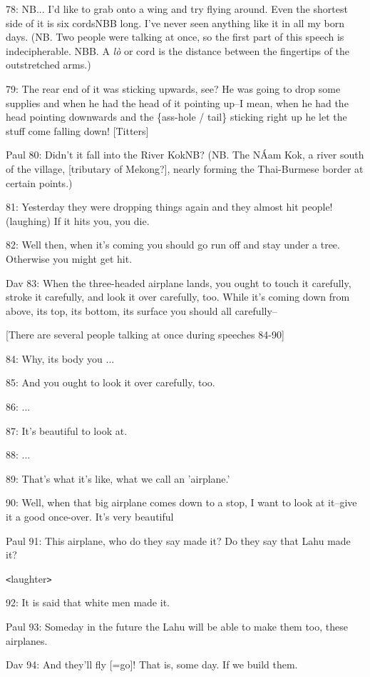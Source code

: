 78: NB... I'd like to grab onto a wing and try flying around. Even the shortest
side of it is six cordsNBB long. I've never seen anything like it in all my born
days. (NB. Two people were talking at once, so the first part of this speech is
indecipherable. NBB. A \textit{lò} or cord is the distance between the fingertips
of the outstretched arms.)

79: The rear end of it was sticking upwards, see? He was going to drop some supplies
and when he had the head of it pointing up--I mean, when he had the head pointing
downwards and the \{ass-hole / tail\} sticking right up he let the stuff come falling
down! [Titters]

Paul 80: Didn't it fall into the River KokNB? (NB. The NÁam Kok, a river south
of the village, [tributary of Mekong?], nearly forming the Thai-Burmese border
at certain points.)

81: Yesterday they were dropping things again and they almost hit people! (laughing)
If it hits you, you die.

82: Well then, when it's coming you should go run off and stay under a tree. Otherwise
you might get hit.

Dav 83: When the three-headed airplane lands, you ought to touch it carefully,
stroke it carefully, and look it over carefully, too. While it's coming down from
above, its top, its bottom, its surface you should all carefully--

[There are several people talking at once during speeches 84-90]

84: Why, its body you ...

85: And you ought to look it over carefully, too.

86: ...

87: It's beautiful to look at.

88: ...

89: That's what it's like, what we call an 'airplane.'

90: Well, when that big airplane comes down to a stop, I want to look at it--give
it a good once-over. It's very beautiful

Paul 91: This airplane, who do they say made it? Do they say that Lahu made it?

\texttt{<}laughter\texttt{>}

92: It is said that white men made it.

Paul 93: Someday in the future the Lahu will be able to make them too, these airplanes.

Dav 94: And they'll fly [=go]! That is, some day. If we build them.

